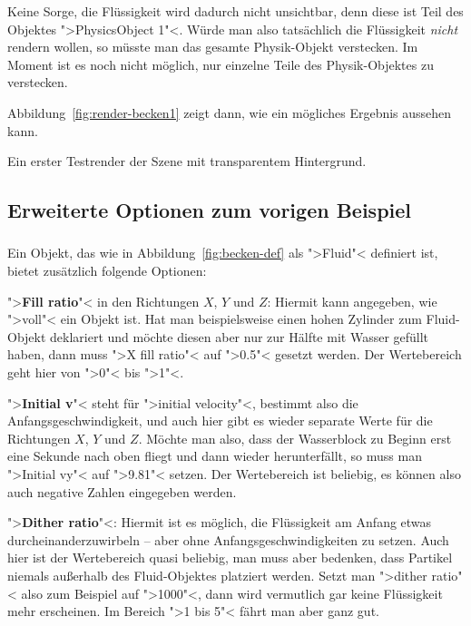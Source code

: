 \documentclass[10pt,DIV=14,a4paper]{scrartcl}
\begin{document}
	Keine Sorge, die Flüssigkeit wird dadurch nicht unsichtbar, denn
	diese ist Teil des Objektes ">PhysicsObject 1"<. Würde man also
	tatsächlich die Flüssigkeit \emph{nicht} rendern wollen, so müsste
	man das gesamte Physik-Objekt verstecken. Im Moment ist es noch
	nicht möglich, nur einzelne Teile des Physik-Objektes zu verstecken.

\itE

Abbildung~\ref{fig:render-becken1} zeigt dann, wie ein mögliches
Ergebnis aussehen kann.

{Ein erster Testrender der Szene mit transparentem Hintergrund.}

\subsection{Erweiterte Optionen zum vorigen Beispiel}
\subsubsection{}
Ein Objekt, das wie in Abbildung~\ref{fig:becken-def} als ">Fluid"<
definiert ist, bietet zusätzlich folgende Optionen:

\itA
	\item ">\textbf{Fill ratio}"< in den Richtungen $X$, $Y$ und $Z$:
	Hiermit kann angegeben, wie ">voll"< ein Objekt ist. Hat man
	beispielsweise einen hohen Zylinder zum Fluid-Objekt deklariert und
	möchte diesen aber nur zur Hälfte mit Wasser gefüllt haben, dann
	muss ">X fill ratio"< auf ">0.5"< gesetzt werden. Der Wertebereich
	geht hier von ">0"< bis ">1"<.

	\item ">\textbf{Initial v}"< steht für ">initial velocity"<,
	bestimmt also die Anfangsgeschwindigkeit, und auch hier gibt es
	wieder separate Werte für die Richtungen $X$, $Y$ und $Z$. Möchte
	man also, dass der Wasserblock zu Beginn erst eine Sekunde nach oben
	fliegt und dann wieder herunterfällt, so muss man ">Initial vy"< auf
	">9.81"< setzen. Der Wertebereich ist beliebig, es können also auch
	negative Zahlen eingegeben werden.

	\item ">\textbf{Dither ratio}"<: Hiermit ist es möglich, die
	Flüssigkeit am Anfang etwas durcheinanderzuwirbeln -- aber ohne
	Anfangsgeschwindigkeiten zu setzen. Auch hier ist der Wertebereich
	quasi beliebig, man muss aber bedenken, dass Partikel niemals
	außerhalb des Fluid-Objektes platziert werden. Setzt man ">dither
	ratio"< also zum Beispiel auf ">1000"<, dann wird vermutlich gar
	keine Flüssigkeit mehr erscheinen. Im Bereich ">1 bis 5"< fährt man
	aber ganz gut.
\end{document}

